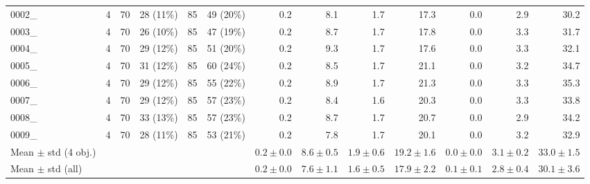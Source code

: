 \begin{table}[t]
\begin{tabular}{lcccccrrrrrrr}
0002\_ & 4 & 70 & 28 (11\%) & 85 & 49 (20\%) & 0.2 & 8.1 & 1.7 & 17.3 & 0.0 & 2.9 & 30.2 \\
0003\_ & 4 & 70 & 26 (10\%) & 85 & 47 (19\%) & 0.2 & 8.7 & 1.7 & 17.8 & 0.0 & 3.3 & 31.7 \\
0004\_ & 4 & 70 & 29 (12\%) & 85 & 51 (20\%) & 0.2 & 9.3 & 1.7 & 17.6 & 0.0 & 3.3 & 32.1 \\
0005\_ & 4 & 70 & 31 (12\%) & 85 & 60 (24\%) & 0.2 & 8.5 & 1.7 & 21.1 & 0.0 & 3.2 & 34.7 \\
0006\_ & 4 & 70 & 29 (12\%) & 85 & 55 (22\%) & 0.2 & 8.9 & 1.7 & 21.3 & 0.0 & 3.3 & 35.3 \\
0007\_ & 4 & 70 & 29 (12\%) & 85 & 57 (23\%) & 0.2 & 8.4 & 1.6 & 20.3 & 0.0 & 3.3 & 33.8 \\
0008\_ & 4 & 70 & 33 (13\%) & 85 & 57 (23\%) & 0.2 & 8.7 & 1.7 & 20.7 & 0.0 & 2.9 & 34.2 \\
0009\_ & 4 & 70 & 28 (11\%) & 85 & 53 (21\%) & 0.2 & 7.8 & 1.7 & 20.1 & 0.0 & 3.2 & 32.9 \\
\hline
Mean $\pm$ std (4 obj.) & & & & & & $0.2 \pm 0.0$ & $8.6 \pm 0.5$ & $1.9 \pm 0.6$ & $19.2 \pm 1.6$ & $0.0 \pm 0.0$ & $3.1 \pm 0.2$ & $33.0 \pm 1.5$ \\
\hline
Mean $\pm$ std (all) & & & & & & $0.2 \pm 0.0$ & $7.6 \pm 1.1$ & $1.6 \pm 0.5$ & $17.9 \pm 2.2$ & $0.1 \pm 0.1$ & $2.8 \pm 0.4$ & $30.1 \pm 3.6$ \\
\hline
\end{tabular}
\end{table}

